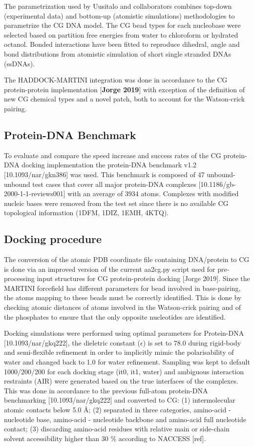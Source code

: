 \documentclass[a4,center,fleqn]{NAR}
\begin{document}
The parametrization used by Uusitalo and collaborators combines top-down (experimental data) and bottom-up (atomistic simulations) methodologies to parametrize the CG DNA model. The CG bead types for each nucleobase were selected based on partition free energies from water to chloroform or hydrated octanol. Bonded interactions have been fitted to reproduce dihedral, angle and bond distributions from atomistic simulation of short single stranded DNAs (ssDNAs).

The HADDOCK-MARTINI integration was done in accordance to the CG protein-protein implementation [\textbf{Jorge 2019}] with exception of the definition of new CG chemical types and a novel patch, both to account for the Watson-crick pairing.

\subsection{Protein-DNA Benchmark}
To evaluate and compare the speed increase and success rates of the CG protein-DNA docking implementation the protein-DNA benchmark v1.2 [10.1093/nar/gkn386] was used. This benchmark is composed of 47 unbound-unbound test cases that cover all major protein-DNA complexes [10.1186/gb-2000-1-1-reviews001] with an average of 3934 atoms. Complexes with modified nucleic bases were removed from the test set since there is no available CG topological information (1DFM, 1DIZ, 1EMH, 4KTQ). 

\subsection{Docking procedure}
The conversion of the atomic PDB coordinate file containing DNA/protein to CG is done via an improved version of the current aa2cg.py script used for pre-processing input structures for CG protein-protein docking [Jorge 2019]. Since the MARTINI forcefield has different parameters for bead involved in base-pairing, the atoms mapping to these beads must be correctly identified. This is done by checking atomic distances of atoms involved in the Watson-crick pairing and of the phosphates to ensure that the only opposite nucleotides are identified. 

Docking simulations were performed using optimal parameters for Protein-DNA [10.1093/nar/gkq222], the dieletric constant ($\epsilon$) is set to 78.0 during rigid-body and semi-flexible refinement in order to implicitly mimic the polarisability of water and changed back to 1.0 for water refinement. %
Sampling was kept to default 1000/200/200 for each docking stage (it0, it1, water) and ambiguous interaction restraints (AIR) were generated based on the true interfaces of the complexes. This was done in accordance to the previous full-atom protein-DNA benchmarking [10.1093/nar/gkq222] and converted to CG: (1) intermolecular atomic contacts below 5.0 \AA; (2) separated in three categories, amino-acid - nucleotide base, amino-acid - nucleotide backbone and amino-acid full nucleotide contact; (3) discarding amino-acid residues with relative main or side-chain solvent accessibility higher than 30 \% according to NACCESS [ref]. 
\end{document}
